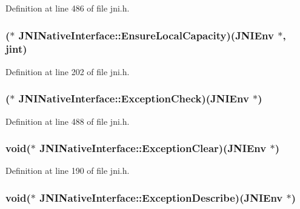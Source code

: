Definition at line 486 of file jni.\-h.

\hypertarget{struct_j_n_i_native_interface_a21fffa598cb7f4000960e25332d50a1b}{
\subsubsection[{Ensure\-Local\-Capacity}]{($\ast$ J\-N\-I\-Native\-Interface\-::\-Ensure\-Local\-Capacity)({\bf J\-N\-I\-Env} $\ast$, {\bf jint})}}\label{struct_j_n_i_native_interface_a21fffa598cb7f4000960e25332d50a1b}


Definition at line 202 of file jni.\-h.

\hypertarget{struct_j_n_i_native_interface_a564fcc3d379ef237a1e39345949cf914}{
\subsubsection[{Exception\-Check}]{($\ast$ J\-N\-I\-Native\-Interface\-::\-Exception\-Check)({\bf J\-N\-I\-Env} $\ast$)}}\label{struct_j_n_i_native_interface_a564fcc3d379ef237a1e39345949cf914}


Definition at line 488 of file jni.\-h.

\hypertarget{struct_j_n_i_native_interface_a08597ec383f90a94171afe8e7744516b}{
\subsubsection[{Exception\-Clear}]{\setlength{\rightskip}{0pt plus 5cm}void($\ast$ J\-N\-I\-Native\-Interface\-::\-Exception\-Clear)({\bf J\-N\-I\-Env} $\ast$)}}\label{struct_j_n_i_native_interface_a08597ec383f90a94171afe8e7744516b}


Definition at line 190 of file jni.\-h.

\hypertarget{struct_j_n_i_native_interface_a13530dabbd5f1047a9741dd0e88d8c5e}{
\subsubsection[{Exception\-Describe}]{\setlength{\rightskip}{0pt plus 5cm}void($\ast$ J\-N\-I\-Native\-Interface\-::\-Exception\-Describe)({\bf J\-N\-I\-Env} $\ast$)}}\label{struct_j_n_i_native_interface_a13530dabbd5f1047a9741dd0e88d8c5e}


